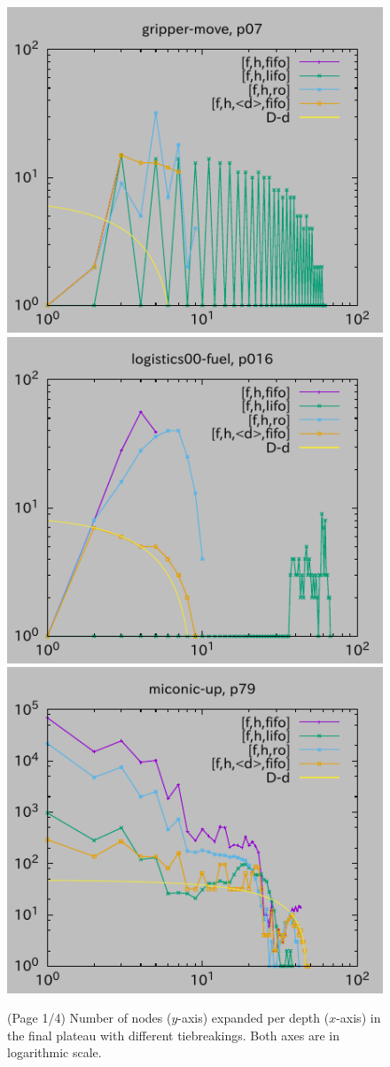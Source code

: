 \begin{figure}[htbp]
\includegraphics{img/depth/gripper-move/p07.pdf}
\includegraphics{img/depth/logistics00-fuel/p016.pdf}
\includegraphics{img/depth/miconic-up/p79.pdf}
 \caption{(Page 1/4) Number of nodes ($y$-axis) expanded per depth ($x$-axis) in
 the final plateau with different tiebreakings. Both axes are in logarithmic scale.
 }
 \label{fig:depth-histogram}
\end{figure}

